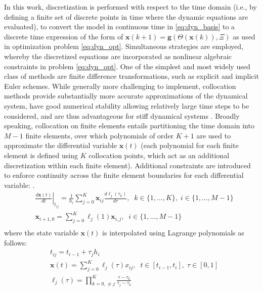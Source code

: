 \documentclass[12pt]{article}
\begin{document}
In this work, discretization is performed with respect to the time domain (i.e., by defining a finite set of discrete points in time where the dynamic equations are evaluated), to convert the model in continuous time in \eqref{eq:dyn_basis} to a discrete time expression of the form of $\textbf{x}({k+1}) = \textbf{g}(\Theta(\textbf{x}(k)),\Xi)$ as used  in optimization problem \eqref{eq:dyn_opt}. Simultaneous strategies  \cite{biegler2010nonlinear} are employed, whereby the discretized equations are incorporated as nonlinear algebraic constraints in problem \eqref{eq:dyn_opt}. One of the simplest and most widely used class of methods are finite difference transformations, such as explicit and implicit Euler schemes. While generally more challenging to implement, collocation methods provide  substantially more accurate approximations of the dynamical system, have good numerical stability allowing relatively large time steps to be considered, and are thus advantageous for stiff dynamical systems \cite{biegler2010nonlinear}. Broadly speaking, collocation on finite elements entails partitioning the time domain into $M-1$ finite elements, over which polynomials of order $K+1$ are used to approximate the differential variable $\textbf{x}(t)$ (each polynomial for each finite element is defined using $K$ collocation points,  which act as an additional discretization within each finite element). Additional constraints are introduced to enforce continuity across the finite element boundaries for each differential variable: \cite{biegler2010nonlinear}.
\begin{equation}
\begin{aligned}
\label{eq:collocation1}
& \left. \frac{d\textbf{x}(t)}{dt} \right \vert_{t_{ij}} =  \frac{1}{h_i}\sum_{j=0}^{K}\textbf{x}_{ij}\frac{d\ell_j(\tau_k)}{d\tau}, \;\; k \in \{1,\dots,K\}, \; i\in \{ 1,\dots,M-1\} \\
& \textbf{x}_{i+1,0} = \sum^{K}_{j=0} \ell_j(1)\textbf{x}_{i,j}, \;\; i\in \{1,\dots,M-1\} \\
\end{aligned}
\end{equation}
where the state variable $\textbf{x}(t)$ is interpolated using Lagrange polynomials as follows:
\begin{equation}
\begin{aligned}
\label{eq:collocation}
& t_{ij} = t_{i-1}+\tau_jh_i \\
& \textbf{x}(t) = \sum^{K}_{j=0}\ell_j(\tau)x_{ij}, \;\; t\in [t_{i-1}, t_i], \; \tau \in [0,1] \\
& \ell_j(\tau) = \prod^{K}_{k=0,\neq j} \frac{\tau-\tau_k}{\tau_j-\tau_k}
\end{aligned}
\end{equation}
\end{document}
